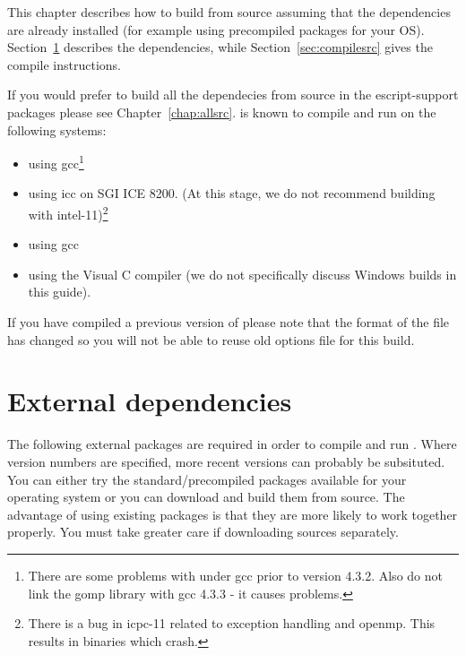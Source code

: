 %
%
%



This chapter describes how to build \esfinley from source assuming that the dependencies are already installed (for example using precompiled packages for your OS).
Section~\ref{sec:deps} describes the dependencies, while Section~\ref{sec:compilesrc} gives the compile instructions.

If you would prefer to build all the dependecies from source in the escript-support packages please see Chapter~\ref{chap:allsrc}.
\esfinley is known to compile and run on the following systems:
\begin{itemize}
 \item \linux using gcc\footnote{There are some problems with \openmp under gcc prior to version 4.3.2. Also do not link the gomp library with gcc 4.3.3 - it causes problems.}
\item \linux using icc on SGI ICE 8200. (At this stage, we do not recommend building with intel-11)\footnote{There is a bug in icpc-11 related to exception handling and openmp. This results in binaries which crash.}
\item \macosx using gcc
\item \winxp using the Visual C compiler (we do not specifically discuss Windows builds in this guide).
\end{itemize}

If you have compiled a previous version of \esfinley please note that the format of the  file has changed so you will not be able to reuse old options file for this build.


\section{External dependencies}
\label{sec:deps}
The following external packages are required in order to compile and run \esfinley.
Where version numbers are specified, more recent versions can probably be subsituted.
You can either try the standard/precompiled packages available for your operating system or you can download and build them from source.
The advantage of using existing packages is that they are more likely to work together properly.
You must take greater care if downloading sources separately.

